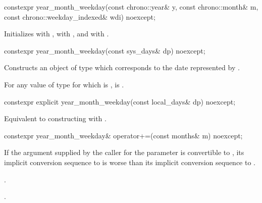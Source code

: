%
\begin{itemdecl}
constexpr year_month_weekday(const chrono::year& y, const chrono::month& m,
                             const chrono::weekday_indexed& wdi) noexcept;
\end{itemdecl}

\begin{itemdescr}
\pnum
\effects
Initializes  with ,  with , and  with .
\end{itemdescr}

%
\begin{itemdecl}
constexpr year_month_weekday(const sys_days& dp) noexcept;
\end{itemdecl}

\begin{itemdescr}
\pnum
\effects
Constructs an object of type 
which corresponds to the date represented by .

\pnum
\remarks
For any value  of type 
for which  is ,
 is .
\end{itemdescr}

%
\begin{itemdecl}
constexpr explicit year_month_weekday(const local_days& dp) noexcept;
\end{itemdecl}

\begin{itemdescr}
\pnum
\effects
Equivalent to constructing with .
\end{itemdescr}

%
\begin{itemdecl}
constexpr year_month_weekday& operator+=(const months& m) noexcept;
\end{itemdecl}

\begin{itemdescr}
\pnum
\constraints
If the argument supplied by the caller for the  parameter
is convertible to ,
its implicit conversion sequence to 
is worse than its implicit conversion sequence to
.

\pnum
\effects
{}.

\pnum
\returns
{}.
\end{itemdescr}

